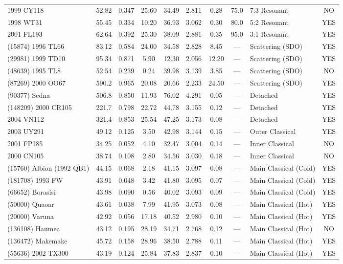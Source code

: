 \documentclass[11pt,a4paper]{article}
\begin{document}
\begin{table}[H]
\begin{tabular}{lccccccclc}
1999 CY118 & 52.82 & 0.347 & 25.60 & 34.49 & 2.811 & 0.28 & 75.0 & 7:3 Resonant & NO \\
1998 WT31 & 55.45 & 0.334 & 10.20 & 36.93 & 3.062 & 0.30 & 80.0 & 5:2 Resonant & YES \\
2001 FL193 & 62.64 & 0.392 & 25.30 & 38.09 & 2.881 & 0.35 & 95.0 & 3:1 Resonant & YES \\
(15874) 1996 TL66 & 83.12 & 0.584 & 24.00 & 34.58 & 2.828 & 8.45 & --- & Scattering (SDO) & YES \\
(29981) 1999 TD10 & 95.34 & 0.871 & 5.90 & 12.30 & 2.056 & 12.20 & --- & Scattering (SDO) & YES \\
(48639) 1995 TL8 & 52.54 & 0.239 & 0.24 & 39.98 & 3.139 & 3.85 & --- & Scattering (SDO) & NO \\
(87269) 2000 OO67 & 590.2 & 0.965 & 20.08 & 20.66 & 2.233 & 24.50 & --- & Scattering (SDO) & YES \\
(90377) Sedna & 506.8 & 0.850 & 11.93 & 76.02 & 4.291 & 0.05 & --- & Detached & YES \\
(148209) 2000 CR105 & 221.7 & 0.798 & 22.72 & 44.78 & 3.155 & 0.12 & --- & Detached & YES \\
2004 VN112 & 321.4 & 0.853 & 25.54 & 47.25 & 3.173 & 0.08 & --- & Detached & YES \\
2003 UY291 & 49.12 & 0.125 & 3.50 & 42.98 & 3.144 & 0.15 & --- & Outer Classical & YES \\
2001 FP185 & 34.25 & 0.052 & 4.10 & 32.47 & 3.004 & 0.14 & --- & Inner Classical & NO \\
2000 CN105 & 38.74 & 0.108 & 2.80 & 34.56 & 3.030 & 0.18 & --- & Inner Classical & NO \\
(15760) Albion (1992 QB1) & 44.15 & 0.068 & 2.18 & 41.15 & 3.097 & 0.08 & --- & Main Classical (Cold) & YES \\
(181708) 1993 FW & 43.91 & 0.048 & 3.42 & 41.80 & 3.095 & 0.07 & --- & Main Classical (Cold) & YES \\
(66652) Borasisi & 43.98 & 0.090 & 0.56 & 40.02 & 3.093 & 0.09 & --- & Main Classical (Cold) & YES \\
(50000) Quaoar & 43.61 & 0.038 & 7.99 & 41.95 & 3.073 & 0.08 & --- & Main Classical (Hot) & YES \\
(20000) Varuna & 42.92 & 0.056 & 17.18 & 40.52 & 2.980 & 0.10 & --- & Main Classical (Hot) & YES \\
(136108) Haumea & 43.12 & 0.195 & 28.19 & 34.71 & 2.768 & 0.12 & --- & Main Classical (Hot) & NO \\
(136472) Makemake & 45.72 & 0.158 & 28.96 & 38.50 & 2.788 & 0.11 & --- & Main Classical (Hot) & YES \\
(55636) 2002 TX300 & 43.19 & 0.124 & 25.84 & 37.83 & 2.837 & 0.10 & --- & Main Classical (Hot) & YES \\
\bottomrule
\end{tabular}
\end{table}
\end{document}
